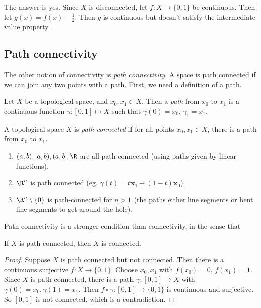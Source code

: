 \documentclass[a4paper]{article}
\begin{document}
The answer is yes. Since $X$ is disconnected, let $f: X\to \{0, 1\}$ be continuous. Then let $g(x) = f(x) - \frac{1}{2}$. Then $g$ is continuous but doesn't satisfy the intermediate value property.

\subsection{Path connectivity}
The other notion of connectivity is \emph{path connectivity}. A space is path connected if we can join any two points with a path. First, we need a definition of a path.

\begin{defi}[Path]
  Let $X$ be a topological space, and $x_0, x_1 \in X$. Then a \emph{path} from $x_0$ to $x_1$ is a continuous function $\gamma: [0, 1] \mapsto X$ such that $\gamma(0) = x_0$, $\gamma_1 = x_1$.
\end{defi}

\begin{defi}
  A topological space $X$ is \emph{path connected} if for all points $x_0, x_1 \in X$, there is a path from $x_0$ to $x_1$.
\end{defi}

\begin{eg}\leavevmode
  \begin{enumerate}
    \item $(a, b), [a, b), (a, b], \R$ are all path connected (using paths given by linear functions).
    \item $\R^n$ is path connected (eg. $\gamma (t) = t \mathbf{x}_1 + (1 - t)\mathbf{x}_0$).
    \item $\R^n\setminus \{0\}$ is path-connected for $n > 1$ (the paths either line segments or bent line segments to get around the hole).
  \end{enumerate}
\end{eg}

Path connectivity is a stronger condition than connectivity, in the sense that
\begin{prop}
  If $X$ is path connected, then $X$ is connected.
\end{prop}

\begin{proof}
  Suppose $X$ is path connected but not connected. Then there is a continuous surjective $f: X\to \{0, 1\}$. Choose $x_0, x_1$ with $f(x_0) = 0$, $f(x_1) = 1$. Since $X$ is path connected, there is a path $\gamma: [0, 1] \to X$ with $\gamma (0) = x_0, \gamma(1) = x_1$. Then $f\circ \gamma: [0, 1] \to \{0, 1\}$ is continuous and surjective. So $[0, 1]$ is not connected, which is a contradiction.
\end{proof}
\end{document}
